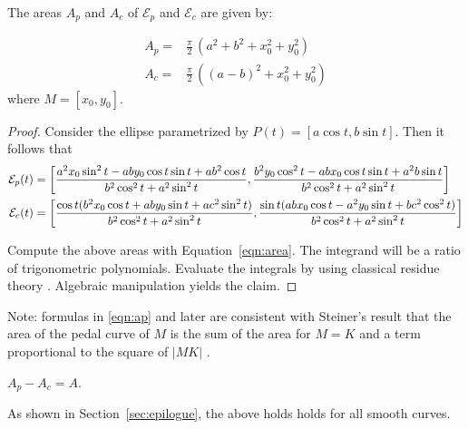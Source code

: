 \begin{proposition}\label{prop:areapc}
The areas $A_p$ and $A_c$ of $\mathcal{E}_p$ and  $\mathcal{E}_c$ are given by: 

\begin{align}
A_p=&\frac{\pi}{2}\, \left( {a}^{2}+{b}^{2}+   x_0 ^{2}+  y_0^{2} \right) \label{eqn:ap} \\
A_c=&\frac{\pi}{2}\, \left( (a-b)^2 +   x_0 ^{2}+  y_0^{2} \right) \nonumber
\end{align}
where $M = [x_0,y_0]$. 
\end{proposition}


\begin{proof} Consider the ellipse parametrized by $P(t)=[a\cos t,b\sin t]$. Then it follows that
{\small 
\[\aligned
	\mathcal{E}_p(t)&=  \left[\frac{   a^2 x_0\sin^2 t -ab y_0\cos t\sin t+ab^2\cos t }{   b^2\cos ^2t+a^2\sin ^2t },  \frac{ b^2y_0\cos^2t -abx_0\cos t \sin t +a^2b\sin  t}{   b^2 \cos ^2t +a^2 \sin^2 t}\right]\\
	\mathcal{E}_c(t)&=\left[ \frac{\cos t( b^2x_0\cos t  + a b y_0 \sin t + a c^2\sin^2{t})}{ b^2 \cos ^2t +a^2 \sin^2 t},
	\frac{ \sin t( a b x_0 \cos t  - a^2 y_0\sin t   + b c^2\cos^2{t})  }{ b^2 \cos ^2t +a^2 \sin^2 t}\right]
	\endaligned \]
	}
 
Compute the above areas with Equation~\eqref{eqn:area}. The integrand will be a ratio of trigonometric polynomials. Evaluate the integrals by using classical residue theory \cite{ahlfors1979-complex}. Algebraic manipulation yields the claim.
\end{proof}

\noindent Note: formulas in \eqref{eqn:ap} and later are consistent with Steiner's result that the area of the pedal curve of $M$ is the sum of the area for $M=K$ and a term proportional to the square of $|MK|$ \cite[p.~47]{steiner1838}.

\begin{corollary}
$A_p-A_c=A$.
\label{cor:area-diff}
\end{corollary}

\noindent As shown in Section~\ref{sec:epilogue}, the above holds holds for all smooth curves.


